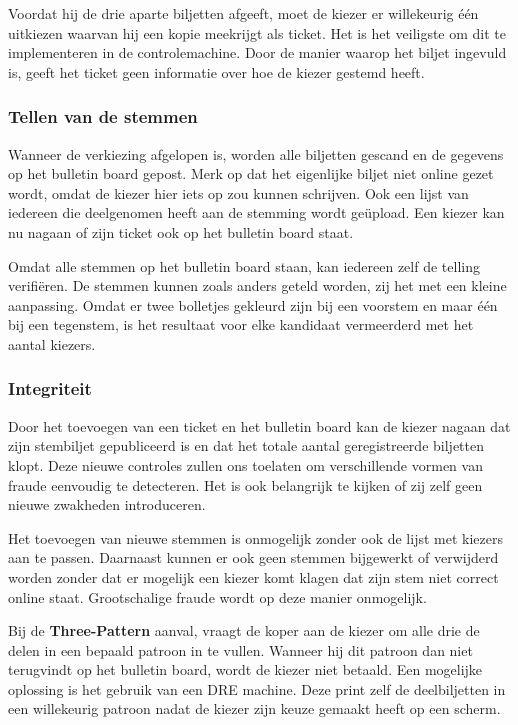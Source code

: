\npar Voordat hij de drie aparte biljetten afgeeft, moet de kiezer er willekeurig \'e\'en uitkiezen waarvan hij een kopie meekrijgt als ticket. Het is het veiligste om dit te implementeren in de controlemachine. Door de manier waarop het biljet ingevuld is, geeft het ticket geen informatie over hoe de kiezer gestemd heeft.

\subsubsection{Tellen van de stemmen}

Wanneer de verkiezing afgelopen is, worden alle biljetten gescand en de gegevens op het bulletin board gepost. Merk op dat het eigenlijke biljet niet online gezet wordt, omdat de kiezer hier iets op zou kunnen schrijven. Ook een lijst van iedereen die deelgenomen heeft aan de stemming wordt ge\"upload. Een kiezer kan nu nagaan of zijn ticket ook op het bulletin board staat.

\npar Omdat alle stemmen op het bulletin board staan, kan iedereen zelf de telling verifi\"eren. De stemmen kunnen zoals anders geteld worden, zij het met een kleine aanpassing. Omdat er twee bolletjes gekleurd zijn bij een voorstem en maar \'e\'en bij een tegenstem, is het resultaat voor elke kandidaat vermeerderd met het aantal kiezers.

\subsubsection{Integriteit}
\label{sec:ls:integriteit}

Door het toevoegen van een ticket en het bulletin board kan de kiezer nagaan dat zijn stembiljet gepubliceerd is en dat het totale aantal geregistreerde biljetten klopt. Deze nieuwe controles zullen ons toelaten om verschillende vormen van fraude eenvoudig te detecteren. Het is ook belangrijk te kijken of zij zelf geen nieuwe zwakheden introduceren.

\npar Het toevoegen van nieuwe stemmen is onmogelijk zonder ook de lijst met kiezers aan te passen. Daarnaast kunnen er ook geen stemmen bijgewerkt of verwijderd worden zonder dat er mogelijk een kiezer komt klagen dat zijn stem niet correct online staat. Grootschalige fraude wordt op deze manier onmogelijk.

\npar Bij de \textbf{Three-Pattern} aanval, vraagt de koper aan de kiezer om alle drie de delen in een bepaald patroon in te vullen. Wanneer hij dit patroon dan niet terugvindt op het bulletin board, wordt de kiezer niet betaald. Een mogelijke oplossing is het gebruik van een DRE machine. Deze print zelf de deelbiljetten in een willekeurig patroon nadat de kiezer zijn keuze gemaakt heeft op een scherm.

